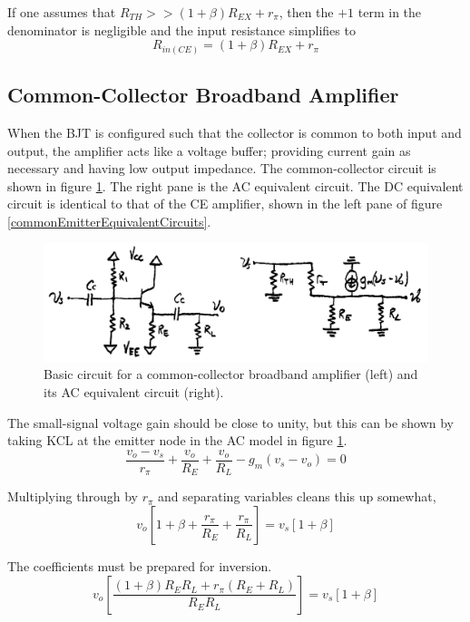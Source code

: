 \documentclass[titlepage, letterpaper, 11pt]{article}
\begin{document}
If one assumes that $R_{TH}>>(1+\beta)R_{EX}+r_{\pi}$, then the
$+1$ term in the denominator is negligible and the input resistance
simplifies to
\begin{equation}
R_{in(CE)}=(1+\beta)R_{EX}+r_{\pi}
\label{ceRin}
\end{equation}

\subsection{Common-Collector Broadband Amplifier}

When the BJT is configured such that the collector is common to both
input and output, the amplifier acts like a voltage buffer; providing
current gain as necessary and having low output impedance. The
common-collector circuit is shown in figure
\ref{commonCollectorAmplifier}. The right pane is the AC equivalent
circuit. The DC equivalent circuit is identical to that of the CE
amplifier, shown in the left pane of figure
\ref{commonEmitterEquivalentCircuits}.

\begin{figure}[ht]
	\centering
	\includegraphics[width=.75\textwidth]
		{figures/commonCollectorAmplifier.png}
	\caption{
		Basic circuit for a common-collector broadband amplifier
		(left) and its AC equivalent circuit (right).
	}
	\label{commonCollectorAmplifier}
\end{figure}

The small-signal voltage gain should be close to unity, but this can
be shown by taking KCL at the emitter node in the AC model in figure
\ref{commonCollectorAmplifier}.
\begin{equation*}
\frac{v_{o}-v_{s}}{r_{\pi}}+\frac{v_{o}}{R_{E}}+\frac{v_{o}}{R_{L}}
-g_{m}(v_{s}-v_{o})=0
\end{equation*}

Multiplying through by $r_{\pi}$ and separating variables cleans this
up somewhat,
\begin{equation*}
v_{o}\left[1+\beta+\frac{r_{\pi}}{R_{E}}+\frac{r_{\pi}}{R_{L}}\right]
=v_{s}[1+\beta]
\end{equation*}

The coefficients must be prepared for inversion.
\begin{equation*}
v_{o}\left[\frac{(1+\beta)R_{E}R_{L}+r_{\pi}(R_{E}+R_{L})}
{R_{E}R_{L}}\right]=
v_{s}[1+\beta]
\end{equation*}
\end{document}
